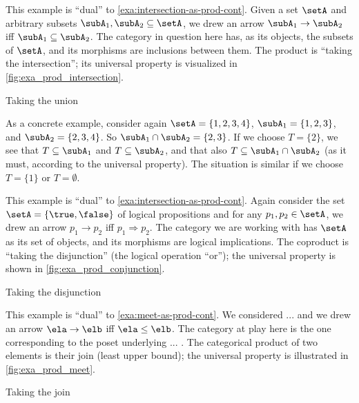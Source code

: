 \begin{example}\label{exa:union-as-coprod-cont}
This example is ``dual'' to \cref{exa:intersection-as-prod-cont}.
Given a set $\setA$ and arbitrary subsets $\subA_1, \subA_2 \subseteq \setA$, we drew an arrow $\subA_1 \to \subA_2$ iff $\subA_1 \subseteq \subA_2$. The category in question here has, as its objects, the subsets of $\setA$, and its morphisms are inclusions between them. The product is ``taking the intersection''; its universal property is visualized in \cref{fig:exa_prod_intersection}.
  \begin{marginfigure}
  \begin{center}
  \end{center}
    \caption{Taking the union}
    \label{fig:exa_coprod_union_cont}
  \end{marginfigure}
 As a concrete example, consider again $\setA = \{ 1, 2, 3, 4 \}$, $\subA_1 = \{ 1, 2, 3 \}$, and $\subA_2 = \{2, 3, 4 \}$. So $\subA_1 \cap \subA_2 = \{2, 3 \}$. If we choose $T = \{ 2 \}$, we see that $T \subseteq \subA_1$ and $T \subseteq \subA_2$, and that also $T \subseteq \subA_1 \cap \subA_2$ (as it must, according to the universal property). The situation is similar if we choose $T = \{ 1\}$ or $T = \emptyset$.
\end{example}


\begin{example}\label{exa:disjunction-as-coprod-cont}
This example is ``dual'' to \cref{exa:intersection-as-prod-cont}. Again consider the set $\setA = \{ \true, \false \}$ of logical propositions and for any $p_1, p_2  \in \setA$, we drew an arrow $p_1 \to p_2$ iff $p_1 \Rightarrow p_2$. The category we are working with has $\setA$ as its set of objects, and its morphisms are logical implications. The coproduct is ``taking the disjunction'' (the logical operation ``or''); the universal property is shown in \cref{fig:exa_prod_conjunction}.
  \begin{marginfigure}
  \begin{center}
  \end{center}
    \caption{Taking the disjunction}
    \label{fig:exa_coprod_disjunction_cont}
  \end{marginfigure}
\end{example}


\begin{example}\label{exa:join-as-coprod-cont}
This example is ``dual'' to \cref{exa:meet-as-prod-cont}. We considered ... and we drew an arrow $\ela \to \elb$ iff $\ela \leq \elb$. The category at play here is the one corresponding to the poset underlying ... . The categorical product of two elements is their join (least upper bound); the universal property is illustrated in \cref{fig:exa_prod_meet}.
  \begin{marginfigure}
  \begin{center}
  \end{center}
    \caption{Taking the join}
    \label{fig:exa_coprod_join_cont}
  \end{marginfigure}
\end{example}

